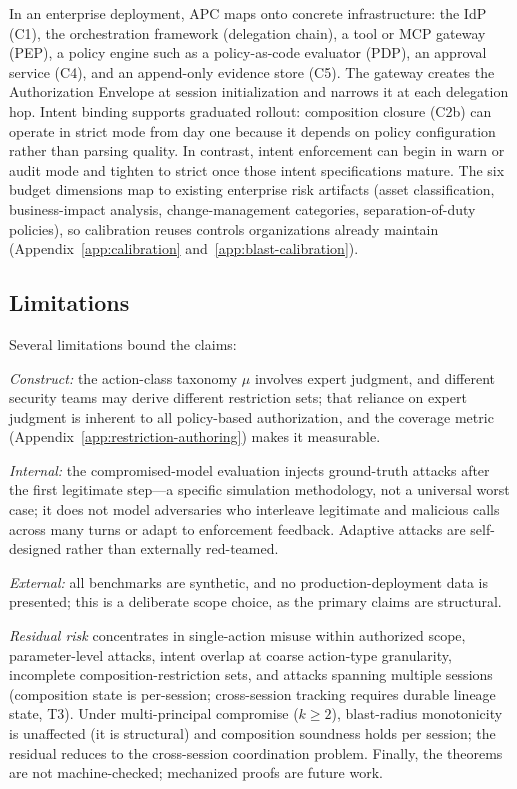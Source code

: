 \documentclass[sigconf,nonacm]{acmart}
\begin{document}
In an enterprise deployment, APC maps onto concrete infrastructure: the IdP (C1), the orchestration framework (delegation chain), a tool or MCP gateway (PEP), a policy engine such as a policy-as-code evaluator (PDP), an approval service (C4), and an append-only evidence store (C5). The gateway creates the Authorization Envelope at session initialization and narrows it at each delegation hop. Intent binding supports graduated rollout: composition closure (C2b) can operate in strict mode from day one because it depends on policy configuration rather than parsing quality. In contrast, intent enforcement can begin in warn or audit mode and tighten to strict once those intent specifications mature. The six budget dimensions map to existing enterprise risk artifacts (asset classification, business-impact analysis, change-management categories, separation-of-duty policies), so calibration reuses controls organizations already maintain (Appendix~\ref{app:calibration} and~\ref{app:blast-calibration}).

\subsection{Limitations}\label{sec:limitations}

Several limitations bound the claims:

\emph{Construct:} the action-class taxonomy $\mu$ involves expert judgment, and different security teams may derive different restriction sets; that reliance on expert judgment is inherent to all policy-based authorization, and the coverage metric (Appendix~\ref{app:restriction-authoring}) makes it measurable.

\emph{Internal:} the compromised-model evaluation injects ground-truth attacks after the first legitimate step---a specific simulation methodology, not a universal worst case; it does not model adversaries who interleave legitimate and malicious calls across many turns or adapt to enforcement feedback. Adaptive attacks are self-designed rather than externally red-teamed.

\emph{External:} all benchmarks are synthetic, and no production-deployment data is presented; this is a deliberate scope choice, as the primary claims are structural.

\emph{Residual risk} concentrates in single-action misuse within authorized scope, parameter-level attacks, intent overlap at coarse action-type granularity, incomplete composition-restriction sets, and attacks spanning multiple sessions (composition state is per-session; cross-session tracking requires durable lineage state, T3). Under multi-principal compromise ($k \geq 2$), blast-radius monotonicity is unaffected (it is structural) and composition soundness holds per session; the residual reduces to the cross-session coordination problem. Finally, the theorems are not machine-checked; mechanized proofs are future work.
\end{document}
